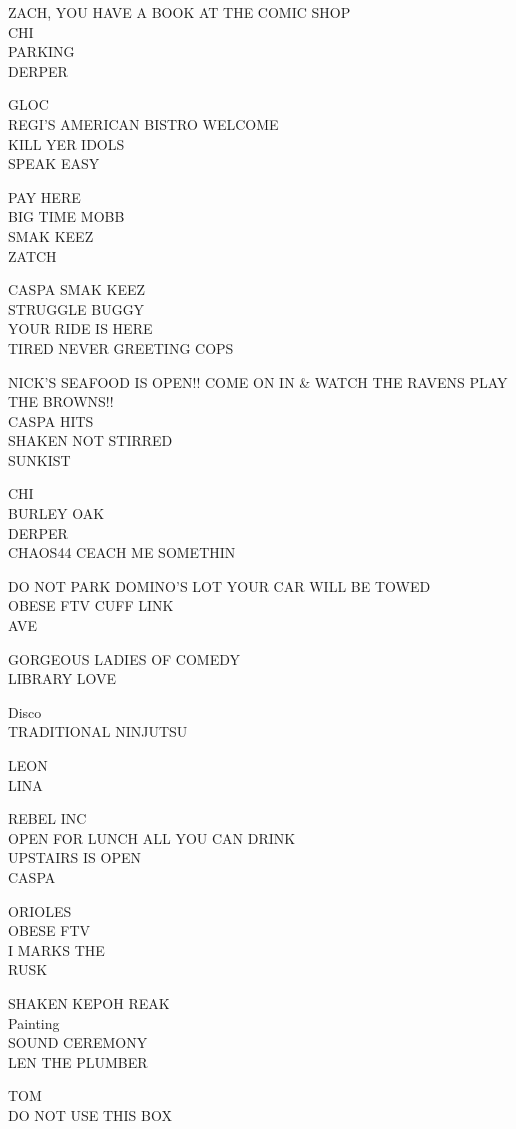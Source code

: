 \documentclass[10pt,letterpaper]{article}
\begin{document}
ZACH, YOU HAVE A BOOK AT THE COMIC SHOP\\
CHI\\
PARKING\\
DERPER

GLOC\\
REGI'S AMERICAN BISTRO WELCOME\\
KILL YER IDOLS\\
SPEAK EASY

PAY HERE\\
BIG TIME MOBB\\
SMAK KEEZ\\
ZATCH

CASPA SMAK KEEZ\\
STRUGGLE BUGGY\\
YOUR RIDE IS HERE\\
TIRED NEVER GREETING COPS

NICK'S SEAFOOD IS OPEN!! COME ON IN \& WATCH THE RAVENS PLAY THE BROWNS!!\\
CASPA HITS\\
SHAKEN NOT STIRRED\\
SUNKIST

CHI\\
BURLEY OAK\\
DERPER\\
CHAOS44 CEACH ME SOMETHIN

DO NOT PARK DOMINO'S LOT YOUR CAR WILL BE TOWED\\
OBESE FTV CUFF LINK\\
AVE

GORGEOUS LADIES OF COMEDY\\
LIBRARY LOVE

Disco\\
TRADITIONAL NINJUTSU

LEON\\
LINA

REBEL INC\\
OPEN FOR LUNCH ALL YOU CAN DRINK\\
UPSTAIRS IS OPEN\\
CASPA

ORIOLES\\
OBESE FTV\\
I MARKS THE\\
RUSK

SHAKEN KEPOH REAK\\
Painting\\
SOUND CEREMONY\\
LEN THE PLUMBER

TOM\\
DO NOT USE THIS BOX
\end{document}
